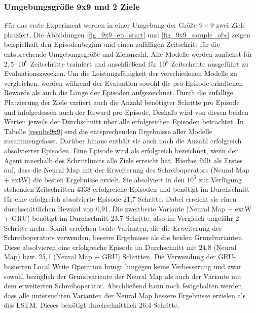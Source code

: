 \subsubsection{Umgebungsgröße 9x9 und 2 Ziele}
Für das erste Experiment werden in einer Umgebung der Größe $9 \times 9$ zwei Ziele platziert. Die Abbildungen \ref{fig_9x9_ep_start} und \ref{fig_9x9_sample_obs} zeigen beispielhaft den Episodenbeginn und einen zufälligen Zeitschritt für die entsprechende Umgebungsgröße und Zielanzahl. Alle Modelle werden zunächst für $2,5\cdot10^6$ Zeitschritte trainiert und anschließend für $10^5$ Zeitschritte ausgeführt zu Evaluationszwecken. Um die Leistungsfähigkeit der verschiedenen Modelle zu vergleichen, werden während der Evaluation sowohl die pro Episode erhaltenen Rewards als auch die Länge der Episoden aufgezeichnet. Durch die zufällige Platzierung der Ziele variiert auch die Anzahl benötigter Schritte pro Episode und infolgedessen auch der Reward pro Episode. Deshalb wird von diesen beiden Werten jeweils der Durchschnitt über alle erfolgreichen Episoden betrachtet. In Tabelle \ref{results9x9} sind die entsprechenden Ergebnisse aller Modelle zusammengefasst. Darüber hinaus enthält sie auch noch die Anzahl erfolgreich absolvierter Episoden. Eine Episode wird als erfolgreich bezeichnet, wenn der Agent innerhalb des Schrittlimits alle Ziele erreicht hat. Hierbei fällt als Erstes auf, dass die Neural Map mit der Erweiterung des Schreiboperators (Neural Map + extW) die besten Ergebnisse erzielt. Sie absolviert in den $10^5$ zur Verfügung stehenden Zeitschritten 4338 erfolgreiche Episoden und benötigt im Durchschnitt für eine erfolgreich absolvierte Episode 21,7 Schritte. Dabei erreicht sie einen durchscnittlichen Reward von 0,91. Die zweitbeste Variante (Neural Map + extW + GRU) benötigt im Durchschnitt 23,7 Schritte, also im Vergleich ungefähr 2 Schritte mehr. Somit erreichen beide Varianten, die die Erweiterung des Schreiboperators verwenden, bessere Ergebnisse als die beiden Grundvarianten. Diese absolvieren eine erfolgreiche Episode im Durchschnitt mit 24,8 (Neural Map) bzw. 25,1 (Neural Map + GRU) Schritten. Die Verwendung der GRU-basierten Local Write Operation bringt hingegen keine Verbesserung und zwar sowohl bezüglich der Grundvariante der Neural Map als auch der Variante mit dem erweiterten Schreiboperator. Abschließend kann noch festgehalten werden, dass alle untersuchten Varianten der Neural Map bessere Ergebnisse erzielen als das LSTM. Dieses benötigt durchschnittlich 26,4 Schritte.

